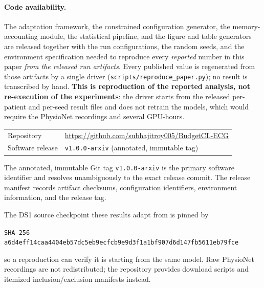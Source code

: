 \begin{sloppypar}
\paragraph{Code availability.} The adaptation framework, the constrained
configuration generator, the memory-accounting module, the statistical
pipeline, and the figure and table generators are released together with the
run configurations, the random seeds, and the environment specification needed
to reproduce every \emph{reported} number in this paper \emph{from the
released run artifacts}. Every published value is regenerated from those
artifacts by a single driver (\texttt{scripts/reproduce\_paper.py}); no result
is transcribed by hand. \textbf{This is reproduction of the reported analysis,
not re-execution of the experiments}: the driver starts from the released
per-patient and per-seed result files and does not retrain the models, which
would require the PhysioNet recordings and several GPU-hours.

\vspace{0.3em}
\noindent
\begin{tabular}{@{}ll@{}}
Repository & \url{https://github.com/subhajitroy005/BudgetCL-ECG} \\
Software release & \texttt{v1.0.0-arxiv} (annotated, immutable tag) \\
\end{tabular}

\vspace{0.3em}
\noindent
The annotated, immutable Git tag \texttt{v1.0.0-arxiv} is the primary software
identifier and resolves unambiguously to the exact release commit. The release
manifest records artifact checksums, configuration identifiers, environment
information, and the release tag.

\noindent
The DS1 source checkpoint these results adapt from is pinned by

\vspace{0.2em}
\noindent\hspace*{\fill}%
\texttt{SHA-256 a6d4eff14caa4404eb57dc5e\-b9ecfcb9e9d3f1a1bf907d6d147fb5611eb79fce}%
\hspace*{\fill}
\vspace{0.2em}

\noindent
so a reproduction can verify it is starting from the same model. Raw PhysioNet
recordings are not redistributed; the repository provides download scripts and
itemized inclusion/exclusion manifests instead.
\end{sloppypar}

